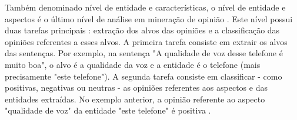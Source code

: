 \documentclass[template.tex]{subfiles}
\begin{document}

Também denominado nível de entidade e características, o nível de entidade e aspectos é o último nível de análise em mineração de opinião \cite{bing:2012}. Este nível possui duas tarefas principais \cite{bing:2012}: extração dos alvos das opiniões e a classificação das opiniões referentes a esses alvos. A primeira tarefa consiste em extrair os alvos das sentenças. Por exemplo, na sentença "A qualidade de voz desse telefone é muito boa", o alvo é a qualidade da voz e a entidade é o telefone (mais precisamente "este telefone"). A segunda tarefa consiste em classificar - como positivas, negativas ou neutras - as opiniões referentes aos aspectos e das entidades extraídas. No exemplo anterior, a opinião referente ao aspecto "qualidade de voz" da entidade "este telefone" é positiva \cite{bing:2012}.

\end{document}

